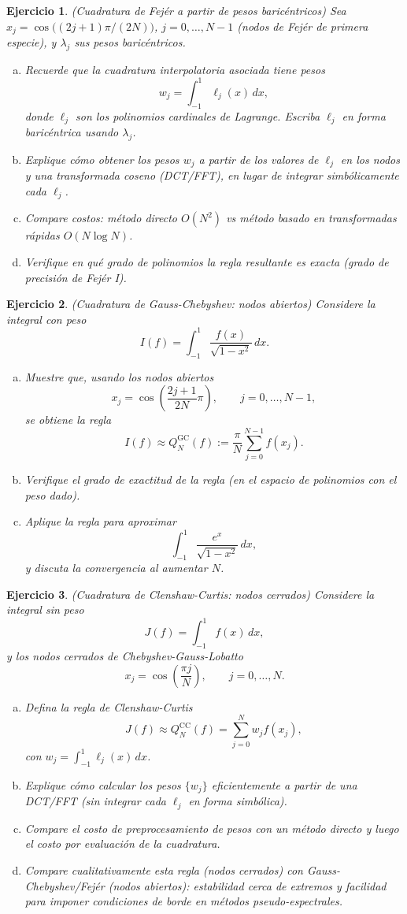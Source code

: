 \documentclass[12pt]{article}
\newtheorem{exercise}{Ejercicio}
\newcommand{\bej}{\begin{exercise}\rm}
\newcommand{\fej}{\end{exercise}}
\begin{document}
\bej
(Cuadratura de Fejér a partir de pesos baricéntricos)
Sea $x_j=\cos\big((2j+1)\pi/(2N)\big)$, $j=0,\ldots,N-1$ (nodos de Fejér de primera especie), y $\lambda_j$ sus pesos baricéntricos.
\begin{enumerate}[(a)]
    \item Recuerde que la cuadratura interpolatoria asociada tiene pesos
    \[
    w_j=\int_{-1}^{1}\ell_j(x)\,dx,
    \]
    donde $\ell_j$ son los polinomios cardinales de Lagrange. Escriba $\ell_j$ en forma baricéntrica usando $\lambda_j$.
    \item Explique cómo obtener los pesos $w_j$ a partir de los valores de $\ell_j$ en los nodos y una transformada coseno (DCT/FFT), en lugar de integrar simbólicamente cada $\ell_j$.
    \item Compare costos: método directo $O(N^2)$ vs método basado en transformadas rápidas $O(N\log N)$.
    \item Verifique en qué grado de polinomios la regla resultante es exacta (grado de precisión de Fejér I).
\end{enumerate}
\fej

\bej
(Cuadratura de Gauss-Chebyshev: nodos abiertos)
Considere la integral con peso
\[
I(f)=\int_{-1}^{1}\frac{f(x)}{\sqrt{1-x^2}}\,dx.
\]
\begin{enumerate}[(a)]
    \item Muestre que, usando los nodos abiertos
    \[
    x_j=\cos\left(\frac{2j+1}{2N}\pi\right),\qquad j=0,\ldots,N-1,
    \]
    se obtiene la regla
    \[
    I(f)\approx Q_N^{\mathrm{GC}}(f):=\frac{\pi}{N}\sum_{j=0}^{N-1}f(x_j).
    \]
    \item Verifique el grado de exactitud de la regla (en el espacio de polinomios con el peso dado).
    \item Aplique la regla para aproximar
    \[
    \int_{-1}^{1}\frac{e^x}{\sqrt{1-x^2}}\,dx,
    \]
    y discuta la convergencia al aumentar $N$.
\end{enumerate}
\fej

\bej
(Cuadratura de Clenshaw-Curtis: nodos cerrados)
Considere la integral sin peso
\[
J(f)=\int_{-1}^{1}f(x)\,dx,
\]
y los nodos cerrados de Chebyshev-Gauss-Lobatto
\[
x_j=\cos\left(\frac{\pi j}{N}\right),\qquad j=0,\ldots,N.
\]
\begin{enumerate}[(a)]
    \item Defina la regla de Clenshaw-Curtis
    \[
    J(f)\approx Q_N^{\mathrm{CC}}(f)=\sum_{j=0}^{N}w_j f(x_j),
    \]
    con $w_j=\int_{-1}^{1}\ell_j(x)\,dx$.
    \item Explique cómo calcular los pesos $\{w_j\}$ eficientemente a partir de una DCT/FFT (sin integrar cada $\ell_j$ en forma simbólica).
    \item Compare el costo de preprocesamiento de pesos con un método directo y luego el costo por evaluación de la cuadratura.
    \item Compare cualitativamente esta regla (nodos cerrados) con Gauss-Chebyshev/Fejér (nodos abiertos): estabilidad cerca de extremos y facilidad para imponer condiciones de borde en métodos pseudo-espectrales.
\end{enumerate}
\fej
\end{document}
